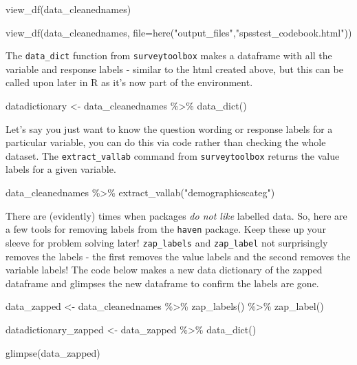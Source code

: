 \documentclass[
  letterpaper,
  DIV=11,
  numbers=noendperiod]{scrreprt}
\newenvironment{Shaded}{\begin{snugshade}}{\end{snugshade}}
\newcommand{\AttributeTok}[1]{\textcolor[rgb]{0.40,0.45,0.13}{#1}}
\newcommand{\FunctionTok}[1]{\textcolor[rgb]{0.28,0.35,0.67}{#1}}
\newcommand{\NormalTok}[1]{\textcolor[rgb]{0.00,0.23,0.31}{#1}}
\newcommand{\OtherTok}[1]{\textcolor[rgb]{0.00,0.23,0.31}{#1}}
\newcommand{\SpecialCharTok}[1]{\textcolor[rgb]{0.37,0.37,0.37}{#1}}
\newcommand{\StringTok}[1]{\textcolor[rgb]{0.13,0.47,0.30}{#1}}
\begin{document}
\begin{Shaded}
\begin{Highlighting}[]
\FunctionTok{view\_df}\NormalTok{(data\_cleanednames)}

\FunctionTok{view\_df}\NormalTok{(data\_cleanednames, }\AttributeTok{file=}\FunctionTok{here}\NormalTok{(}\StringTok{"output\_files"}\NormalTok{,}\StringTok{"spsstest\_codebook.html"}\NormalTok{))}
\end{Highlighting}
\end{Shaded}

The \texttt{data\_dict} function from \texttt{surveytoolbox} makes a
dataframe with all the variable and response labels - similar to the
html created above, but this can be called upon later in R as it's now
part of the environment.

\begin{Shaded}
\begin{Highlighting}[]
\NormalTok{datadictionary }\OtherTok{\textless{}{-}}\NormalTok{ data\_cleanednames }\SpecialCharTok{\%\textgreater{}\%}
  \FunctionTok{data\_dict}\NormalTok{()}
\end{Highlighting}
\end{Shaded}

Let's say you just want to know the question wording or response labels
for a particular variable, you can do this via code rather than checking
the whole dataset. The \texttt{extract\_vallab} command from
\texttt{surveytoolbox} returns the value labels for a given variable.

\begin{Shaded}
\begin{Highlighting}[]
\NormalTok{data\_cleanednames }\SpecialCharTok{\%\textgreater{}\%}
  \FunctionTok{extract\_vallab}\NormalTok{(}\StringTok{"demographicscateg"}\NormalTok{)}
\end{Highlighting}
\end{Shaded}

There are (evidently) times when packages \emph{do not like} labelled
data. So, here are a few tools for removing labels from the
\texttt{haven} package. Keep these up your sleeve for problem solving
later! \texttt{zap\_labels} and \texttt{zap\_label} not surprisingly
removes the labels - the first removes the value labels and the second
removes the variable labels! The code below makes a new data dictionary
of the zapped dataframe and glimpses the new dataframe to confirm the
labels are gone.

\begin{Shaded}
\begin{Highlighting}[]
\NormalTok{data\_zapped }\OtherTok{\textless{}{-}}\NormalTok{ data\_cleanednames }\SpecialCharTok{\%\textgreater{}\%}
  \FunctionTok{zap\_labels}\NormalTok{() }\SpecialCharTok{\%\textgreater{}\%}
  \FunctionTok{zap\_label}\NormalTok{()}

\NormalTok{datadictionary\_zapped }\OtherTok{\textless{}{-}}\NormalTok{ data\_zapped }\SpecialCharTok{\%\textgreater{}\%}
  \FunctionTok{data\_dict}\NormalTok{()}

\FunctionTok{glimpse}\NormalTok{(data\_zapped)}
\end{Highlighting}
\end{Shaded}
\end{document}
